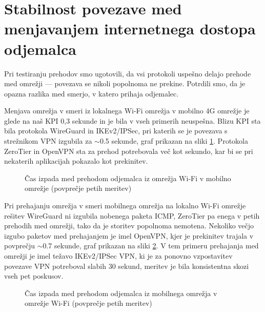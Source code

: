 \documentclass[a4paper, 12pt]{book}
\begin{document}
\section{Stabilnost povezave med menjavanjem internetnega dostopa odjemalca}

Pri testiranju prehodov smo ugotovili, da vsi protokoli uspešno delajo prehode med omrežji --- povezava se nikoli popolnoma ne prekine. Potrdili smo, da je opazna razlika med smerjo, v katero prihaja odjemalec.

Menjava omrežja v smeri iz lokalnega Wi-Fi omrežja v mobilno 4G omrežje je glede na naš KPI 0,3 sekunde in je bila v vseh primerih neuspešna. Blizu KPI sta bila protokola WireGuard in IKEv2/IPSec, pri katerih se je povezava s strežnikom VPN izgubila za $\sim$0.5 sekunde, graf prikazan na sliki \ref{wifitomobile}. Protokola ZeroTier in OpenVPN sta za prehod potrebovala več kot sekundo, kar bi se pri nekaterih aplikacijah pokazalo kot prekinitev.

\begin{figure}[h]
\begin{center}

\end{center}
\caption{Čas izpada med prehodom odjemalca iz omrežja Wi-Fi v mobilno omrežje (povprečje petih meritev)}

\label{wifitomobile}
\end{figure}


Pri prehajanju omrežja v smeri mobilnega omrežja na lokalno Wi-Fi omrežje rešitev WireGuard ni izgubila nobenega paketa ICMP, ZeroTier pa enega v petih prehodih med omrežji, tako da je storitev popolnoma nemotena. Nekoliko večjo izgubo paketov med prehajanjem je imel OpenVPN, kjer je prekinitev trajala v povprečju $\sim$0.7 sekunde, graf prikazan na sliki \ref{mobiletowifi}.
V tem primeru prehajanja med omrežji je imel težavo IKEv2/IPSec VPN, ki je za ponovno vzpostavitev povezave VPN potreboval slabih 30 sekund, meritev je bila konsistentna skozi vseh pet poskusov.

\begin{figure}[h]
\begin{center}

\end{center}
\caption{Čas izpada med prehodom odjemalca iz mobilnega omrežja v omrežje Wi-Fi (povprečje petih meritev)}

\label{mobiletowifi}
\end{figure}
\end{document}
